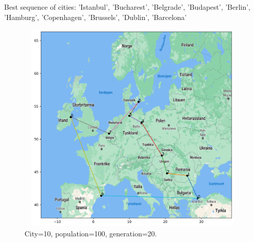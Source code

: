 \documentclass[a4paper,12pt]{article}
\begin{document}
Best sequence of cities: 'Istanbul', 'Bucharest', 'Belgrade', 'Budapest', 'Berlin', 'Hamburg', 'Copenhagen', 'Brussels', 'Dublin', 'Barcelona' \\ 
\begin{figure}[H]
\centerline{\includegraphics[width=6in, height=4in]{geneticMap2.png}}
\caption{City=10, population=100, generation=20.}
\label{fig}
\end{figure}
\end{document}
